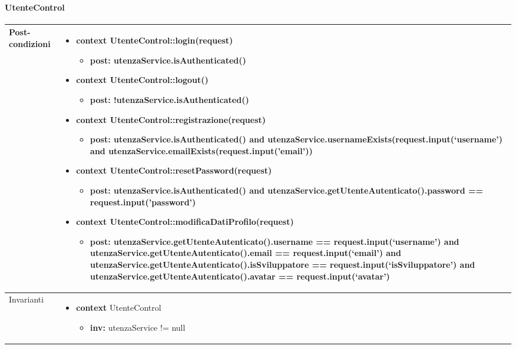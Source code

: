 \newpage
\paragraph{UtenteControl}
\small\begin{tabular}{|| l | p{28em} ||} 
	\hline
	Post-condizioni & \begin{itemize}
		\item \textbf{context} UtenteControl::login(request)
		\begin{itemize}
			\item[ ] \textbf{post:} utenzaService.isAuthenticated()
		\end{itemize}
	  
	    \item \textbf{context} UtenteControl::logout()
		\begin{itemize}
			\item[ ] \textbf{post:} !utenzaService.isAuthenticated()
		\end{itemize} 
	  
	    \item \textbf{context} UtenteControl::registrazione(request) 
		\begin{itemize}
			\item[ ] \textbf{post:} utenzaService.isAuthenticated() and utenzaService.usernameExists(request.input(‘username’) and utenzaService.emailExists(request.input('email'))
		\end{itemize} 
	  
	    \item \textbf{context} UtenteControl::resetPassword(request) 
		\begin{itemize}
			\item[ ] \textbf{post:} utenzaService.isAuthenticated() and utenzaService.getUtenteAutenticato().password == request.input('password')
		\end{itemize} 

	    \item \textbf{context} UtenteControl::modificaDatiProfilo(request) 
		\begin{itemize}
			\item[ ] \textbf{post:} utenzaService.getUtenteAutenticato().username == request.input(‘username’) and utenzaService.getUtenteAutenticato().email == request.input(‘email’) and utenzaService.getUtenteAutenticato().isSviluppatore == request.input(‘isSviluppatore’) and utenzaService.getUtenteAutenticato().avatar == request.input(‘avatar’)
		\end{itemize} 
	\end{itemize}\\
	\hline
	Invarianti & \begin{itemize}
		\item \textbf{context} UtenteControl
		\begin{itemize}
			\item[ ] \textbf{inv:} utenzaService != null
		\end{itemize}
	\end{itemize}\\
	\hline
	\end{tabular}

